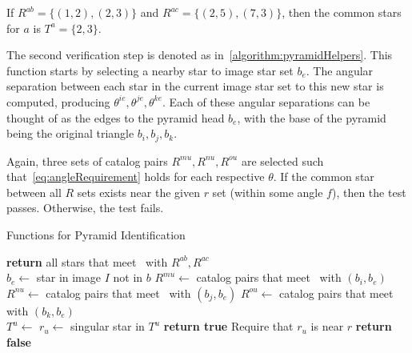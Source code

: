 If $R^{ab} = \{ (1, 2), (2, 3) \}$ and $R^{ac} = \{ (2, 5), (7, 3) \}$, then the common stars for $a$ is
$T^a = \{2, 3\}$.


The second verification step is denoted as  in~\autoref{algorithm:pyramidHelpers}.
This function starts by selecting a nearby star to image star set $b_e$.
The angular separation between each star in the current image star set to this new star is computed, producing
$\theta^{ie}, \theta^{je}, \theta^{ke}$.
Each of these angular separations can be thought of as the edges to the pyramid head $b_e$, with the base of the pyramid
being the original triangle $b_i, b_j, b_k$.

Again, three sets of catalog pairs $R^{mu}, R^{nu}, R^{ou}$ are selected such that~\autoref{eq:angleRequirement} holds
for each respective $\theta$.
If the common star between all $R$ sets exists near the given $r$ set (within some angle $f$), then the test passes.
Otherwise, the test fails.

\begin{algorithm}
    \caption{Functions for Pyramid Identification} \label{algorithm:pyramidHelpers}
    \begin{algorithmic}[1]
        \State \textbf{return} all stars that meet~ with $R^{ab}, R^{ac}$
        \EndFunction
        \\
        \State $b_e \gets $ star in image $I$ not in $b$
        \State $R^{mu} \gets$ catalog pairs that meet~ with $(b_i, b_e)$
        \State $R^{nu} \gets$ catalog pairs that meet~ with $(b_j, b_e)$
        \State $R^{ou} \gets$ catalog pairs that meet~ with $(b_k, b_e)$
        \\
        \State $T^u \gets $ 
        \State $r_u \gets $ singular star in $T^u$
        \State \textbf{return true} \Comment Require that $r_u$ is near $r$
        \EndIf
        \EndIf
        \State \textbf{return false}
        \EndFunction
    \end{algorithmic}
\end{algorithm}

